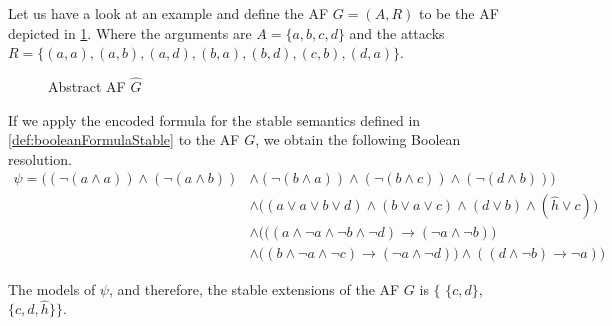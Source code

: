 \begin{example}
    Let us have a look at an example and define the AF $G=(A,R)$ to be the AF depicted in \cref{af:algorithmEncodingsStable}. Where the arguments are $A=\{a, b, c, d\}$ and the attacks $R=\big\{ (a,a), (a,b), (a,d), (b,a), (b,d), (c,b), (d,a)\big\}$.

    \begin{figure}[H]
        \centering
        \caption{Abstract AF $\hat{G}$}
        \label{af:algorithmEncodingsStable}
    \end{figure}

If we apply the encoded formula for the stable semantics defined in \cref{def:booleanFormulaStable} to the AF $G$, we obtain the following Boolean resolution.
\begin{align*}
    \psi = \bigl( (\lnot (a \land a)) \land (\lnot (a \land b)) 
    & \land (\lnot (b \land a)) \land (\lnot (b \land c)) \land (\lnot (d \land b)) \bigl) \\
    &\land \bigl( (a \lor a \lor b \lor d) \land (b \lor a \lor c) \land (d \lor b) \land (\hat{h} \lor c)\bigl) \\
    &\land \bigl( ((a \land \lnot a \land \lnot b \land \lnot d) \rightarrow (\lnot a \land \lnot b)\bigl)\\
    &\land \bigl((b \land \lnot a \land \lnot c) \rightarrow (\lnot a \land \lnot d)) \land ((d \land \lnot b) \rightarrow \lnot a)\bigl)
\end{align*}


The models of $\psi$, and therefore, the stable extensions of the AF $G$ is $\bigl\{ $ $\{c, d\}$, $\{c, d, \hat{h}\} \bigl\}$.
\end{example}




